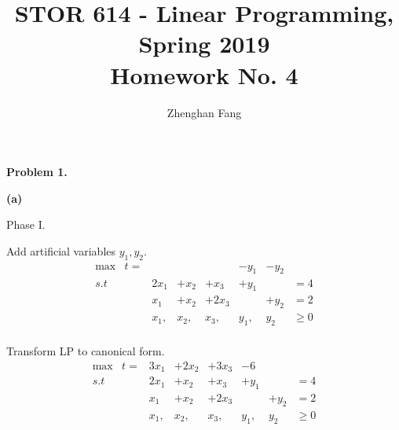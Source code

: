 \documentclass[12pt]{article}
\def\name{Zhenghan Fang}
\begin{document}
 


\title{STOR 614 - Linear Programming, Spring 2019 \\
Homework No. 4}
\author{\name}

\maketitle

\noindent
\textbf{Problem 1.}

\noindent
\textbf{(a)}

Phase I.

Add artificial variables $y_1,y_2$.
\begin{equation*}
  \begin{array}{cccccccc}
    \text{max}& t= &          &   & &  -y_1 &  -y_2 &      \\ 
    s.t       &    &    2x_1      &   + x_2 &    +x_3 &    +y_1 &             &  =4              \\
              &    &    x_1      &    +x_2 &    +2x_3 &     &     +y_2        &  = 2          \\
              &    &    x_1,      &    x_2, &    x_3, &    y_1, &     y_2        &  \ge 0          \\ 
  \end{array}
\end{equation*}

Transform LP to canonical form.
\begin{equation*}
  \begin{array}{cccccccc}
    \text{max}& t= &    3x_1      &+2x_2   & +3x_3 &  -6 &   &      \\ 
    s.t       &    &    2x_1      &   + x_2 &    +x_3 &    +y_1 &             &  =4              \\
              &    &    x_1      &    +x_2 &    +2x_3 &     &     +y_2        &  = 2          \\
              &    &    x_1,      &    x_2, &    x_3, &    y_1, &     y_2        &  \ge 0          \\ 
  \end{array}
\end{equation*}
\end{document}
